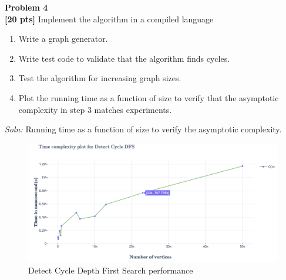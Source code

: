 \documentclass{article}
\newenvironment{problem}[2][Problem]
    { \begin{mdframed}[backgroundcolor=gray!20] \textbf{#1 #2} \\}
    {  \end{mdframed}}
\newenvironment{solution}
    {\textit{Soln:}}
    {}
\begin{document}
\begin{problem}{4}
\textbf{[20 pts]} Implement the algorithm in a compiled language
\begin{enumerate}
    \item Write a graph generator.
    \item Write test code to validate that the algorithm finds cycles.
    \item Test the algorithm for increasing graph sizes.
    \item Plot the running time as a function of size to verify that the asymptotic complexity in step 3 matches experiments.
\end{enumerate}
\end{problem}
\begin{solution}
Running time as a function of size to verify the asymptotic complexity.
\begin{figure}[h]
    \centering
    \includegraphics[scale=0.5]{Alg-1}
    \caption{Detect Cycle Depth First Search performance}
    \label{fig:my_label}
\end{figure}
\end{solution}
\end{document}
